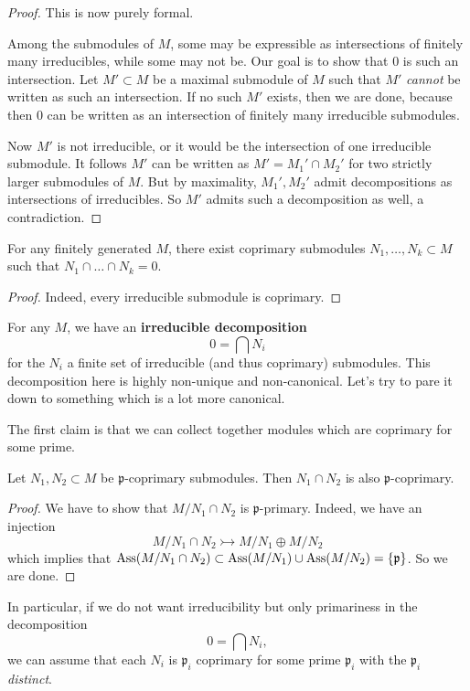 \begin{proof} This is now purely formal. 

Among the submodules of $M$, some may be expressible as intersections of
finitely many irreducibles, while some may not be. Our goal is to show that
$0$ is such an intersection.
Let $M' \subset M$ be a maximal submodule of $M$ such that $M'$ \emph{cannot} be
written as such an intersection. If no such
$M'$ exists, then we are done, because then $0$ can be written as an
intersection of finitely many irreducible submodules.

Now $M'$ is not irreducible, or it would be the intersection of one irreducible
submodule.
It follows $M'$ can be written as $M'=M_1' \cap M_2'$ for two strictly
larger submodules of $M$.  But by maximality, $M_1', M_2'$ admit decompositions as
intersections of irreducibles. So $M'$ admits such a decomposition as well, a contradiction. 
\end{proof} 

\begin{corollary} 
For any finitely generated $M$, there exist coprimary submodules $N_1, \dots,
N_k \subset M$ such that $N_1 \cap \dots \cap N_k  = 0$.
\end{corollary} 
\begin{proof} 
Indeed, every irreducible submodule is coprimary.
\end{proof} 


For any $M$, we have an \textbf{irreducible decomposition}
\[ 0 = \bigcap N_i  \]
for the $N_i$ a finite set of irreducible (and thus coprimary) submodules. 
This decomposition here is highly non-unique and non-canonical. Let's try to
pare it down to something which is a lot more canonical.

The first claim is that we can collect together modules which are coprimary for
some prime. 
\begin{lemma} 
Let $N_1, N_2 \subset M$ be $\mathfrak{p}$-coprimary submodules. Then $N_1 \cap
N_2$ is also $\mathfrak{p}$-coprimary.
\end{lemma} 
\begin{proof} 
We have to show that $M/N_1 \cap N_2$ is $\mathfrak{p}$-primary. Indeed, we have an injection
\[ M/N_1 \cap N_2 \rightarrowtail  M/N_1 \oplus M/N_2  \]
which implies that $\operatorname{Ass}(M/N_1 \cap N_2) \subset \operatorname{Ass}(M/N_1) \cup \operatorname{Ass}(M/N_2) =
\left\{\mathfrak{p}\right\}$. So we are done. 
\end{proof} 

In particular, if we do not want irreducibility but only primariness in the
decomposition
\[ 0 = \bigcap N_i,  \]
we can assume that each $N_i$ is $\mathfrak{p}_i$ coprimary for some
 prime
$\mathfrak{p}_i$ with the $\mathfrak{p}_i$ \emph{distinct}.


